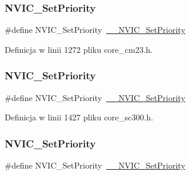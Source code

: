 \subsubsection{\texorpdfstring{N\+V\+I\+C\+\_\+\+Set\+Priority}{NVIC\_SetPriority}\hspace{0.1cm}{\footnotesize\ttfamily [6/12]}}
{\footnotesize\ttfamily \#define N\+V\+I\+C\+\_\+\+Set\+Priority~\hyperlink{group___c_m_s_i_s___core___n_v_i_c_functions_ga505338e23563a9c074910fb14e7d45fd}{\+\_\+\+\_\+\+N\+V\+I\+C\+\_\+\+Set\+Priority}}



Definicja w linii 1272 pliku core\+\_\+cm23.\+h.

\mbox{\label{group___c_m_s_i_s___core___n_v_i_c_functions_gae0e9d0e2f7b6133828c71b57d4941c35}} 
\subsubsection{\texorpdfstring{N\+V\+I\+C\+\_\+\+Set\+Priority}{NVIC\_SetPriority}\hspace{0.1cm}{\footnotesize\ttfamily [7/12]}}
{\footnotesize\ttfamily \#define N\+V\+I\+C\+\_\+\+Set\+Priority~\hyperlink{group___c_m_s_i_s___core___n_v_i_c_functions_ga505338e23563a9c074910fb14e7d45fd}{\+\_\+\+\_\+\+N\+V\+I\+C\+\_\+\+Set\+Priority}}



Definicja w linii 1427 pliku core\+\_\+sc300.\+h.

\mbox{\label{group___c_m_s_i_s___core___n_v_i_c_functions_gae0e9d0e2f7b6133828c71b57d4941c35}} 
\subsubsection{\texorpdfstring{N\+V\+I\+C\+\_\+\+Set\+Priority}{NVIC\_SetPriority}\hspace{0.1cm}{\footnotesize\ttfamily [8/12]}}
{\footnotesize\ttfamily \#define N\+V\+I\+C\+\_\+\+Set\+Priority~\hyperlink{group___c_m_s_i_s___core___n_v_i_c_functions_ga505338e23563a9c074910fb14e7d45fd}{\+\_\+\+\_\+\+N\+V\+I\+C\+\_\+\+Set\+Priority}}



